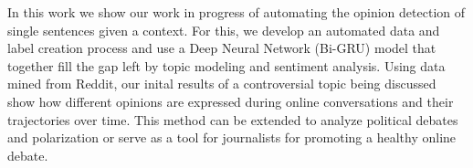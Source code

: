 In this work we show our work in progress of automating the opinion detection of single sentences given a context. For this, we develop an automated data and label creation process and use a Deep Neural Network (Bi-GRU) model that together fill the gap left by topic modeling and sentiment analysis. Using data mined from Reddit, our inital results of a controversial topic being discussed show how different opinions are expressed during online conversations and their trajectories over time. This method can be extended to analyze political debates and polarization or serve as a tool for journalists for promoting a healthy online debate.
